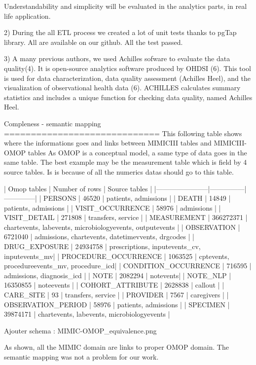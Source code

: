 Understandability and simplicity will be evaluated in the analytics parts, in real life application.

2) 
During the all ETL process we created a lot of unit tests thanks to pgTap library. All are available on our github. All the test passed.

3)
A many previous authors, we used Achilles sofware to evaluate the data quality(4). It is open-source analytics software produced by OHDSI (6).
This tool is used for data characterization, data quality assessment (Achilles Heel), and the visualization of observational health data (6).
ACHILLES calculates summary statistics and includes a unique function for checking data quality, named Achilles Heel. 

Compleness - semantic mapping 
=============================
This following table shows where the informations goes and links between MIMICIII tables and MIMICIII-OMOP tables
As OMOP is a conceptual model, a same type of data goes in the same table. The best example may be the measurement table which is field by 4 source tables. Is is because of all the numerics datas should go to this table.

| Omop tables    	| Number of rows | Source tables |
|-----------------------|---------------|--------------|
| PERSONS 		| 46520         | patients, admissions |
| DEATH 		| 14849         | patients, admissions |
| VISIT_OCCURRENCE 	| 58976         | admissions |
| VISIT_DETAIL 		| 271808        | transfers, service |
| MEASUREMENT 		| 366272371     | chartevents, labevents, microbiologyevents, outputevents |
| OBSERVATION 		| 6721040       | admissions, chartevents, datetimevvents, drgcodes |
| DRUG_EXPOSURE 	| 24934758      | prescriptions, inputevents_cv, inputevents_mv|
| PROCEDURE_OCCURRENCE 	| 1063525       | cptevents, procedureevents_mv, procedure_icd|
| CONDITION_OCCURRENCE 	| 716595        | admissions, diagnosis_icd |
| NOTE 			| 2082294       | notevents|
| NOTE_NLP 		| 16350855      | noteevents |
| COHORT_ATTRIBUTE 	| 2628838       | callout |
| CARE_SITE 		| 93            | transfers, service |
| PROVIDER 		| 7567          | caregivers |
| OBSERVATION_PERIOD 	| 58976         | patients, admissions |
| SPECIMEN 	 	| 39874171      | chartevents, labevents, microbiologyevents |

Ajouter schema : MIMIC-OMOP_equivalence.png

As shown, all the MIMIC domain are links to proper OMOP domain. 
The semantic mapping was not a problem for our work.

